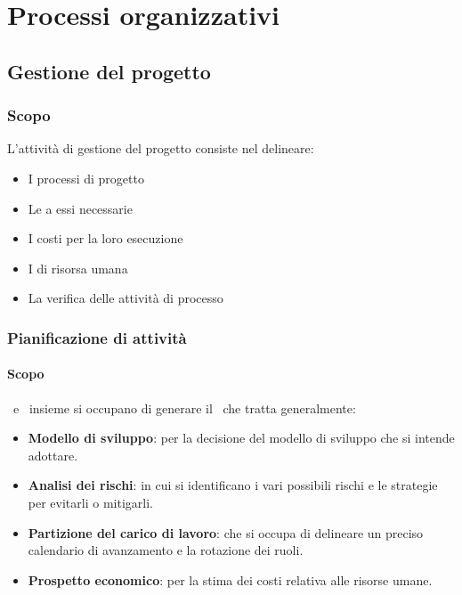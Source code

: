 \section{Processi organizzativi}

    \subsection{Gestione del progetto}\label{GestioneProgetto}

	    \subsubsection{Scopo}
	    L'attività di gestione del progetto consiste nel delineare:
	    \begin{itemize}
	    	\item I processi di progetto
	    	\item Le  a essi necessarie
	    	\item I costi per la loro esecuzione
	    	\item I  di risorsa umana
	    	\item La verifica delle attività di processo
	    \end{itemize}

		\subsubsection{Pianificazione di attività}

			\paragraph{Scopo}
			\Res\ e \Amm\ insieme si occupano di generare il \PdP\ che tratta generalmente:
			\begin{itemize}
				\item \textbf{Modello di sviluppo}: per la decisione del modello di sviluppo che si intende adottare.
				\item \textbf{Analisi dei rischi}: in cui si identificano i vari possibili rischi e le strategie per evitarli o mitigarli.
				\item \textbf{Partizione del carico di lavoro}: che si occupa di delineare un preciso calendario di avanzamento e la rotazione dei ruoli.
				\item \textbf{Prospetto economico}: per la stima dei costi relativa alle risorse umane.
			\end{itemize}

